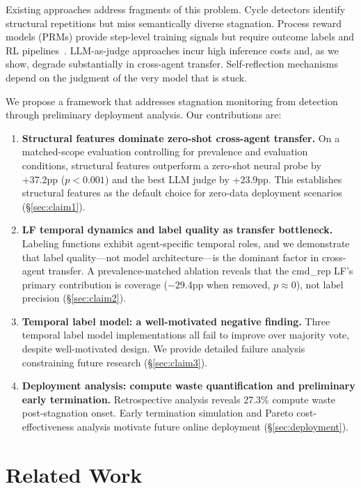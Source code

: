 \documentclass[11pt,a4paper]{article}
\begin{document}
Existing approaches address fragments of this problem.
Cycle detectors identify structural repetitions but miss semantically diverse stagnation.
Process reward models (PRMs) provide step-level training signals but require outcome labels and RL pipelines~\cite{xi2026agentprm}.
LLM-as-judge approaches incur high inference costs and, as we show, degrade substantially in cross-agent transfer.
Self-reflection mechanisms depend on the judgment of the very model that is stuck.

We propose a framework that addresses stagnation monitoring from detection through preliminary deployment analysis. Our contributions are:

\begin{enumerate}
\item \textbf{Structural features dominate zero-shot cross-agent transfer.} On a matched-scope evaluation controlling for prevalence and evaluation conditions, structural features outperform a zero-shot neural probe by +37.2pp ($p{<}0.001$) and the best LLM judge by +23.9pp. This establishes structural features as the default choice for zero-data deployment scenarios (\S\ref{sec:claim1}).

\item \textbf{LF temporal dynamics and label quality as transfer bottleneck.} Labeling functions exhibit agent-specific temporal roles, and we demonstrate that label quality---not model architecture---is the dominant factor in cross-agent transfer. A prevalence-matched ablation reveals that the cmd\_rep LF's primary contribution is coverage ($-$29.4pp when removed, $p{\approx}0$), not label precision (\S\ref{sec:claim2}).

\item \textbf{Temporal label model: a well-motivated negative finding.} Three temporal label model implementations all fail to improve over majority vote, despite well-motivated design. We provide detailed failure analysis constraining future research (\S\ref{sec:claim3}).

\item \textbf{Deployment analysis: compute waste quantification and preliminary early termination.} Retrospective analysis reveals 27.3\% compute waste post-stagnation onset. Early termination simulation and Pareto cost-effectiveness analysis motivate future online deployment (\S\ref{sec:deployment}).
\end{enumerate}

\section{Related Work}
\label{sec:related}
\end{document}
